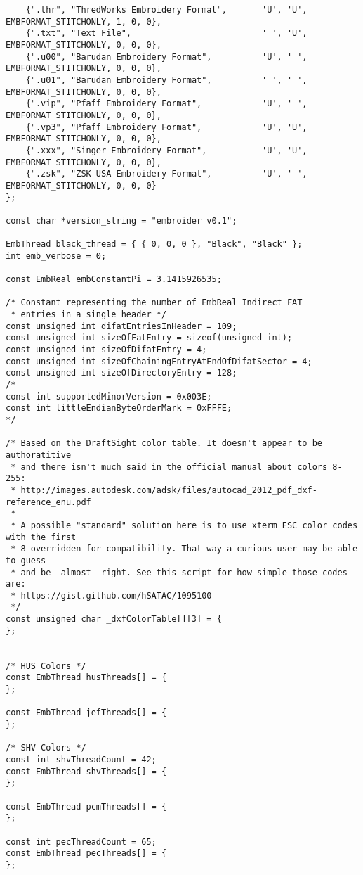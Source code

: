 \begin{lstlisting}
    {".thr", "ThredWorks Embroidery Format",       'U', 'U', EMBFORMAT_STITCHONLY, 1, 0, 0},
    {".txt", "Text File",                          ' ', 'U', EMBFORMAT_STITCHONLY, 0, 0, 0},
    {".u00", "Barudan Embroidery Format",          'U', ' ', EMBFORMAT_STITCHONLY, 0, 0, 0},
    {".u01", "Barudan Embroidery Format",          ' ', ' ', EMBFORMAT_STITCHONLY, 0, 0, 0},
    {".vip", "Pfaff Embroidery Format",            'U', ' ', EMBFORMAT_STITCHONLY, 0, 0, 0},
    {".vp3", "Pfaff Embroidery Format",            'U', 'U', EMBFORMAT_STITCHONLY, 0, 0, 0},
    {".xxx", "Singer Embroidery Format",           'U', 'U', EMBFORMAT_STITCHONLY, 0, 0, 0},
    {".zsk", "ZSK USA Embroidery Format",          'U', ' ', EMBFORMAT_STITCHONLY, 0, 0, 0}
};

const char *version_string = "embroider v0.1";

EmbThread black_thread = { { 0, 0, 0 }, "Black", "Black" };
int emb_verbose = 0;

const EmbReal embConstantPi = 3.1415926535;

/* Constant representing the number of EmbReal Indirect FAT
 * entries in a single header */
const unsigned int difatEntriesInHeader = 109;
const unsigned int sizeOfFatEntry = sizeof(unsigned int);
const unsigned int sizeOfDifatEntry = 4;
const unsigned int sizeOfChainingEntryAtEndOfDifatSector = 4;
const unsigned int sizeOfDirectoryEntry = 128;
/*
const int supportedMinorVersion = 0x003E;
const int littleEndianByteOrderMark = 0xFFFE;
*/

/* Based on the DraftSight color table. It doesn't appear to be authoratitive
 * and there isn't much said in the official manual about colors 8-255:
 * http://images.autodesk.com/adsk/files/autocad_2012_pdf_dxf-reference_enu.pdf
 *
 * A possible "standard" solution here is to use xterm ESC color codes with the first
 * 8 overridden for compatibility. That way a curious user may be able to guess
 * and be _almost_ right. See this script for how simple those codes are:
 * https://gist.github.com/hSATAC/1095100
 */
const unsigned char _dxfColorTable[][3] = {
};


/* HUS Colors */
const EmbThread husThreads[] = {
};

const EmbThread jefThreads[] = {
};

/* SHV Colors */
const int shvThreadCount = 42;
const EmbThread shvThreads[] = {
};

const EmbThread pcmThreads[] = {
};

const int pecThreadCount = 65;
const EmbThread pecThreads[] = {
};


\end{lstlisting}
